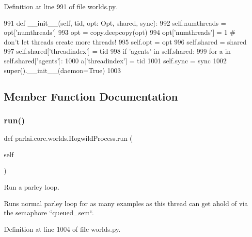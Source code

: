 Definition at line 991 of file worlds.\+py.


\begin{DoxyCode}
991     \textcolor{keyword}{def }\_\_init\_\_(self, tid, opt: Opt, shared, sync):
992         self.numthreads = opt[\textcolor{stringliteral}{'numthreads'}]
993         opt = copy.deepcopy(opt)
994         opt[\textcolor{stringliteral}{'numthreads'}] = 1  \textcolor{comment}{# don't let threads create more threads!}
995         self.opt = opt
996         self.shared = shared
997         self.shared[\textcolor{stringliteral}{'threadindex'}] = tid
998         \textcolor{keywordflow}{if} \textcolor{stringliteral}{'agents'} \textcolor{keywordflow}{in} self.shared:
999             \textcolor{keywordflow}{for} a \textcolor{keywordflow}{in} self.shared[\textcolor{stringliteral}{'agents'}]:
1000                 a[\textcolor{stringliteral}{'threadindex'}] = tid
1001         self.sync = sync
1002         super().\_\_init\_\_(daemon=\textcolor{keyword}{True})
1003 
\end{DoxyCode}


\subsection{Member Function Documentation}
\mbox{\label{classparlai_1_1core_1_1worlds_1_1HogwildProcess_a749caf3085cb7b373db66b6f92567290}} 
\subsubsection{\texorpdfstring{run()}{run()}}
{\footnotesize\ttfamily def parlai.\+core.\+worlds.\+Hogwild\+Process.\+run (\begin{DoxyParamCaption}\item[{}]{self }\end{DoxyParamCaption})}

\begin{DoxyVerb}Run a parley loop.

Runs normal parley loop for as many examples as this thread can get ahold of via
the semaphore ``queued_sem``.
\end{DoxyVerb}
 

Definition at line 1004 of file worlds.\+py.


